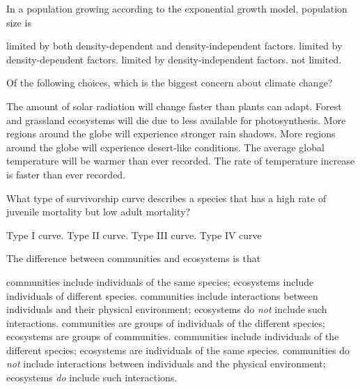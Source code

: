 \question
In a population growing according to the exponential growth model, population size is

\begin{choices}
\choice limited by both density-dependent and density-independent factors. 
\choice limited by density-dependent factors. 
\choice limited by density-independent factors. 
\correctchoice not limited. 
\end{choices}

\question
Of the following choices, which is the biggest concern about climate change?

\begin{choices}
\choice The amount of solar radiation will change faster than plants can adapt. 
\choice Forest and grassland ecosystems will die due to less  available for photosynthesis. 
\choice More regions around the globe will experience stronger rain shadows. 
\choice More regions around the globe will experience desert-like conditions. 
\choice The average global temperature will be warmer than ever recorded.  
\correctchoice The rate of temperature increase is faster than ever recorded. 
\end{choices}
\question
What type of survivorship curve describes a species that has a high rate of juvenile mortality but low adult mortality?

\begin{choices}
\choice Type I curve. %
\choice Type II curve. %
\correctchoice Type III curve. %
\choice Type IV curve %
\end{choices}

\question
The difference between communities and ecosystems is that

\begin{choices}
\choice communities include individuals of the same species; ecosystems include individuals of different species.
\choice communities include interactions between individuals and their physical environment; ecosystems do \emph{not} include such interactions.
\choice communities are groups of individuals of the different species; ecosystems are groups of communities.
\choice communities include individuals of the different species; ecosystems are individuals of the same species.
\correctchoice communities do \emph{not} include interactions between individuals and the physical environment; ecosystems \emph{do} include such interactions.
\end{choices}

